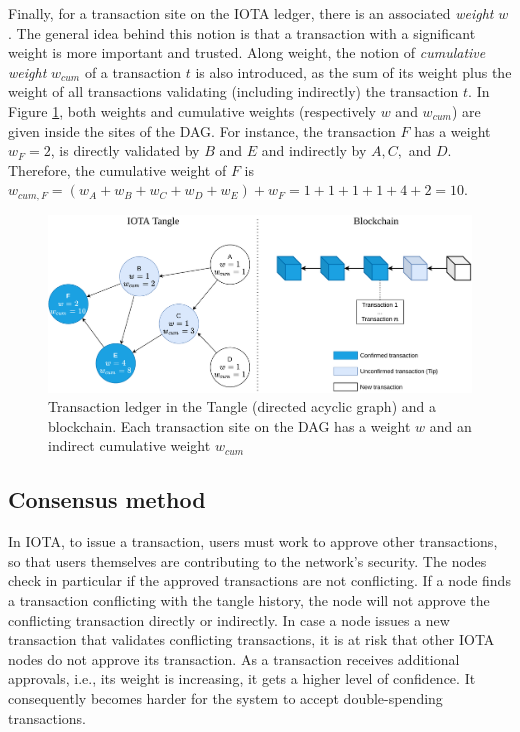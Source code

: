 Finally, for a transaction site on the IOTA ledger, there is an associated \emph{weight} $w$. The general idea behind this notion is that 
a transaction with a significant weight is more important and trusted. Along weight, the notion of \emph{cumulative weight} $w_{cum}$ of a transaction $t$
 is also introduced, as the sum of its weight plus the weight of all transactions validating (including indirectly)  the transaction $t$.
 In Figure \ref{F_dag_vs_blockchain}, both weights and cumulative weights (respectively $w$ and $w_{cum}$) are given inside the sites of the DAG.
 For instance, the transaction $F$ has a weight $w_F = 2 $, is directly validated by $B$ and $E$ and indirectly by $A,C,$ and $D$. 
 Therefore, the cumulative weight of $F$ is $w_{cum,F}= (w_A + w_B + w_C + w_D + w_E) + w_F = 1+1+1+1+4+2 = 10$.  
\begin{figure}[t]
\centering
 \includegraphics[width=\textwidth]{Images/IOTA_vs_blockchain.pdf}
\caption{Transaction ledger in the Tangle (directed acyclic graph) and a blockchain. Each transaction site on the DAG has a weight $w$ and an indirect 
cumulative weight $w_{cum}$}
\label{F_dag_vs_blockchain}
\end{figure}

\subsection{Consensus method}
\label{ss_consensus_method}

In IOTA, to issue a transaction, users must
work to approve other transactions, so that users themselves are
contributing to the network’s security. The nodes check in particular if the
approved transactions are not conflicting. If a node finds a transaction conflicting with the tangle history, the node will not approve the conflicting transaction
directly or indirectly. In case a node issues a new transaction that validates conflicting transactions, it is at risk that other
IOTA nodes do not approve its transaction. As a transaction receives additional approvals, i.e., its weight is increasing, it 
gets a higher level of confidence. It consequently becomes harder for the system
to accept double-spending transactions.

